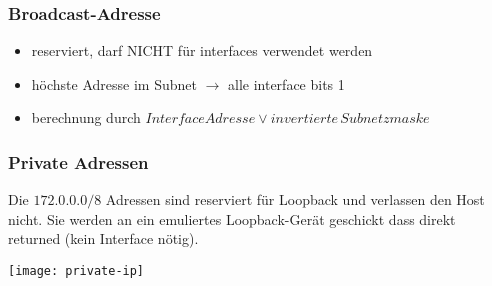 \subsubsection{Broadcast-Adresse}

\begin{itemize}
	\item reserviert, darf NICHT für interfaces verwendet werden
	\item höchste Adresse im Subnet $\rightarrow$ alle interface bits 1
	\item berechnung durch $Interface Adresse \lor invertierte \, Subnetzmaske$
\end{itemize}

\subsubsection{Private Adressen}

Die $172.0.0.0/8$ Adressen sind reserviert für Loopback und verlassen den Host nicht.
Sie werden an ein emuliertes Loopback-Gerät geschickt dass direkt returned 
(kein Interface nötig).
\begin{center}
	\texttt{[image: private-ip]}
\end{center}




